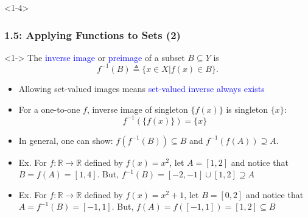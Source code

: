 \documentclass[10pt,english,aspectratio=169]{beamer}
\begin{document}
\begin{frame}<1-4> \frametitle{1.5: Applying Functions to Sets (2)}

\begin{definition}<1->
The \textcolor{blue}{inverse image} or \textcolor{blue}{preimage} of a subset $B\subseteq Y$ is \vspace{-2mm}
\[ f^{-1}(B) \triangleq \{ x\in X | f(x)\in B\}. \]
\end{definition}

\begin{center}
\end{center}
\vspace{-2.5mm}

\begin{itemize}
  \setlength\itemsep{1.25mm}
  \item<3-> Allowing set-valued images means \textcolor{blue}{set-valued inverse always exists}
  \item<4-> For a one-to-one $f$, inverse image of singleton $\{ f(x) \}$ is singleton $\{ x \}$: \vspace{-0.5mm}
  \[ f^{-1}( \{f(x) \}) = \{x\} \]
  \item<5-> In general, one can show: $f(f^{-1}(B)) \subseteq B$ and $f^{-1}(f(A)) \supseteq A$.
  \item<6-> Ex. For $f \colon \mathbb{R} \rightarrow \mathbb{R}$ defined by $f(x)=x^2$, let $A=[1,2]$ and notice that $B = f(A) = [1,4]$.  But, $f^{-1}(B) = [-2,-1] \cup [1,2] \supseteq A$
  \item<7-> Ex. For $f \colon \mathbb{R} \rightarrow \mathbb{R}$ defined by $f(x)=x^2+1$, let $B=[0,2]$ and notice that $A = f^{-1}(B) = [-1,1]$.  But, $f(A) = f([-1,1]) = [1,2] \subseteq B$
\end{itemize}


\end{frame}  
\end{document}

